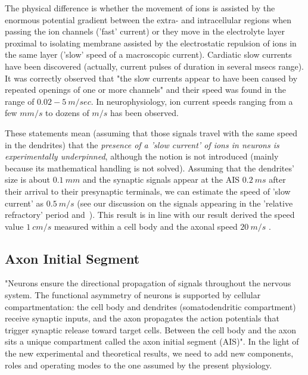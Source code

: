The physical difference is whether the movement of ions is assisted
by the enormous potential gradient between the extra- and intracellular regions
when passing the ion channels ('fast' current)
or they move in the electrolyte layer proximal to isolating membrane
assisted by the electrostatic repulsion of ions in the same layer
('slow' speed of a macroscopic current).
Cardiatic slow currents have been discovered \cite{SlowCurrentChannels:1985}
(actually, current pulses of duration in several msecs range).
It was correctly observed that "the slow currents appear to
have been caused by repeated openings of one or more channels"
and their speed \cite{CardiacAPS:1980} was found in the range of $0.02-5\ m/sec$.
In neurophysiology, ion current speeds
ranging from a few $mm/s$ to dozens of $m/s$ has been observed.

These statements mean (assuming that those signals travel with
the same speed in the dendrites) that the \textit{presence of
a 
{'slow current'} of ions
in neurons is
experimentally underpinned}, although the notion is not introduced
(mainly because its mathematical handling is not solved).
Assuming that the dendrites' size is about $0.1\ mm$ and the synaptic signals appear
at the \gls{AIS} $0.2\ ms$ after their arrival to their presynaptic terminals,
we can estimate the speed of 'slow current' as  $0.5\ m/s$
(see our discussion on the signals appearing in the 'relative refractory'
 period and~\cite{APTemperatureDependenceRefractory:2001}).
This result is in line with our result derived
the speed value $1\ cm/s$ \cite{ActionPotentialGenerationNatrium:2008}
measured  within a cell body and the axonal speed $20\ m/s$ \cite{HodgkinHuxley:1952}.



\subsection{Axon Initial Segment\label{sec:Physiology-AIS}}
"Neurons ensure the directional propagation of signals throughout the nervous system. The functional asymmetry of neurons is supported by cellular compartmentation: the cell body and dendrites (somatodendritic compartment) receive synaptic inputs, and the axon propagates the action potentials that trigger synaptic release toward target cells. Between the cell body and the axon sits a unique compartment called the axon initial segment (AIS)"\cite{AIS_Updated_Viewpoint:2018}.
In the light of the new experimental and theoretical results,
we need to add new components, roles and operating modes to
the one assumed by the present physiology.


